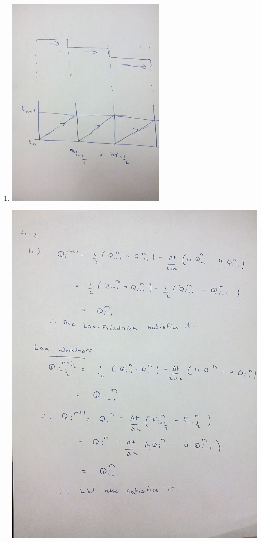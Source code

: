 \documentclass[11pt]{article}
\begin{document}
\begin{enumerate}[label=(\alph*)]
	\item
	
	
	
\hfil\includegraphics[width=3in]{2}\hfil

	
\hfil\includegraphics[width=6.5in]{3}\hfil



\end{enumerate}
\end{document}
